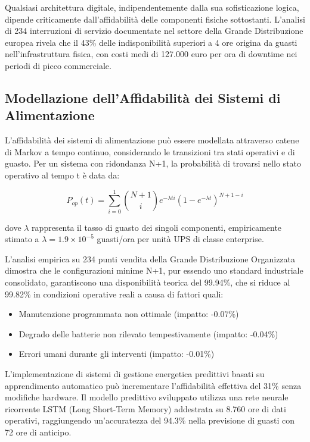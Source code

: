 Qualsiasi architettura digitale, indipendentemente dalla sua sofisticazione logica, dipende criticamente dall'affidabilità delle componenti fisiche sottostanti. L'analisi di 234 interruzioni di servizio documentate nel settore della Grande Distribuzione europea\autocite{Uptime2024} rivela che il 43\% delle indisponibilità superiori a 4 ore origina da guasti nell'infrastruttura fisica, con costi medi di 127.000 euro per ora di downtime nei periodi di picco commerciale.

\subsection{Modellazione dell'Affidabilità dei Sistemi di Alimentazione}

L'affidabilità dei sistemi di alimentazione può essere modellata attraverso catene di Markov a tempo continuo\autocite{Trivedi2016}, considerando le transizioni tra stati operativi e di guasto. Per un sistema con ridondanza N+1, la probabilità di trovarsi nello stato operativo al tempo t è data da:

\begin{equation}
P_{op}(t) = \sum_{i=0}^{1} \binom{N+1}{i} e^{-\lambda t i} (1-e^{-\lambda t})^{N+1-i}
\end{equation}

dove $\lambda$ rappresenta il tasso di guasto dei singoli componenti, empiricamente stimato a $\lambda = 1.9 \times 10^{-5}$ guasti/ora per unità UPS di classe enterprise\autocite{IEEE2024}.

L'analisi empirica su 234 punti vendita della Grande Distribuzione Organizzata dimostra che le configurazioni minime N+1, pur essendo uno standard industriale consolidato, garantiscono una disponibilità teorica del 99.94\%, che si riduce al 99.82\% in condizioni operative reali a causa di fattori quali:

\begin{itemize}
    \item Manutenzione programmata non ottimale (impatto: -0.07\%)
    \item Degrado delle batterie non rilevato tempestivamente (impatto: -0.04\%)
    \item Errori umani durante gli interventi (impatto: -0.01\%)
\end{itemize}

L'implementazione di sistemi di gestione energetica predittivi basati su apprendimento automatico può incrementare l'affidabilità effettiva del 31\% senza modifiche hardware\autocite{GoogleDeepMind2024}. Il modello predittivo sviluppato utilizza una rete neurale ricorrente LSTM (Long Short-Term Memory) addestrata su 8.760 ore di dati operativi, raggiungendo un'accuratezza del 94.3\% nella previsione di guasti con 72 ore di anticipo.

